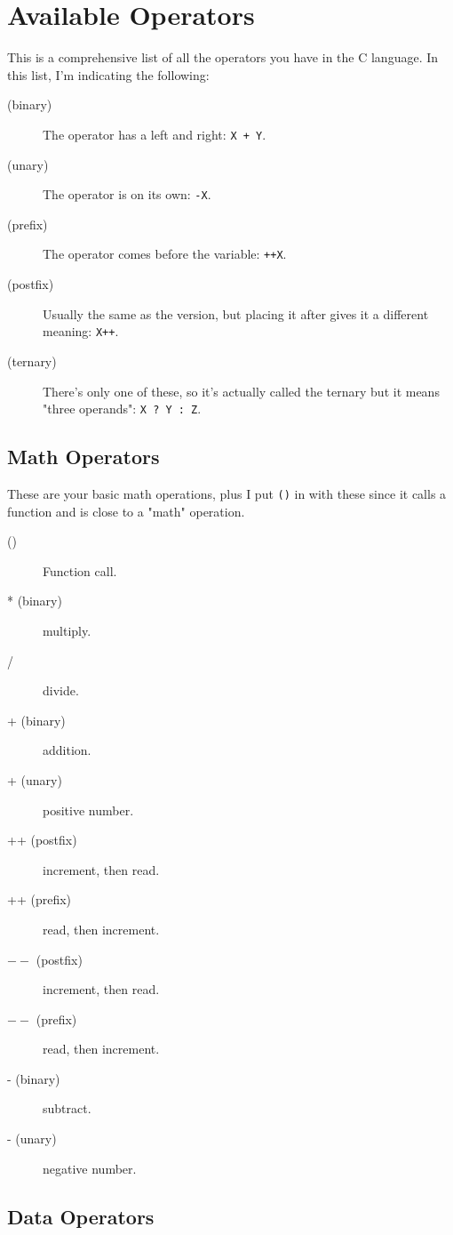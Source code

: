 \section{Available Operators}

This is a comprehensive list of all the operators you have in the C language.
In this list, I'm indicating the following:

\begin{description}
\item[(binary)] The operator has a left and right: \verb|X + Y|.
\item[(unary)] The operator is on its own: \verb|-X|.
\item[(prefix)] The operator comes before the variable: \verb|++X|.
\item[(postfix)] Usually the same as the  version, but placing it
    after gives it a different meaning: \verb|X++|.
\item[(ternary)] There's only one of these, so it's actually called the
    ternary but it means "three operands": \verb|X ? Y : Z|.
\end{description}


\subsection{Math Operators}

These are your basic math operations, plus I put \verb|()| in
with these since it calls a function and is close to a "math"
operation.

\begin{description}
\item[()] Function call.
\item[* (binary)] multiply.
\item[/] divide.
\item[+ (binary)] addition.
\item[+ (unary)] positive number.
\item[++ (postfix)] increment, then read.
\item[++ (prefix)] read, then increment.
\item[$--$ (postfix)] increment, then read.
\item[$--$ (prefix)] read, then increment.
\item[- (binary)] subtract.
\item[- (unary)] negative number.
\end{description}

\subsection{Data Operators}

